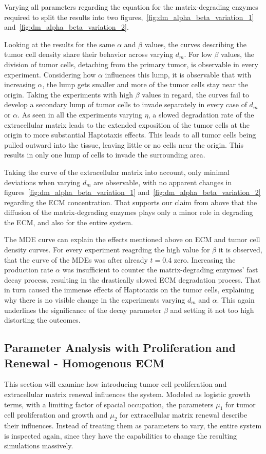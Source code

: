 Varying all parameters regarding the equation for the matrix-degrading enzymes required to split the results into two figures,~\ref{fig:dm_alpha_beta_variation_1} and~\ref{fig:dm_alpha_beta_variation_2}.

Looking at the results for the same $\alpha$ and $\beta$ values, the curves describing the tumor cell density share their behavior across varying $d_m$. For low $\beta$ values, the division of tumor cells, detaching from the primary tumor, is observable in every experiment. Considering how $\alpha$ influences this lump, it is observable that with increasing $\alpha$, the lump gets smaller and more of the tumor cells stay near the origin. Taking the experiments with high $\beta$ values in regard, the curves fail to develop a secondary lump of tumor cells to invade separately in every case of $d_m$ or $\alpha$. As seen in all the experiments varying $\eta$, a slowed degradation rate of the extracellular matrix leads to the extended exposition of the tumor cells at the origin to more substantial Haptotaxis effects. This leads to all tumor cells being pulled outward into the tissue, leaving little or no cells near the origin. This results in only one lump of cells to invade the surrounding area.

Taking the curve of the extracellular matrix into account, only minimal deviations when varying $d_m$ are observable, with no apparent changes in figures~\ref{fig:dm_alpha_beta_variation_1} and~\ref{fig:dm_alpha_beta_variation_2} regarding the ECM concentration. That supports our claim from above that the diffusion of the matrix-degrading enzymes plays only a minor role in degrading the ECM, and also for the entire system.

The MDE curve can explain the effects mentioned above on ECM and tumor cell density curves. For every experiment reagrding the high value for $\beta$ it is observed, that the curve of the MDEs was after already $t=0.4$ zero. Increasing the production rate $\alpha$ was insufficient to counter the matrix-degrading enzymes' fast decay process, resulting in the drastically slowed ECM degradation process. That in turn caused the immense effects of Haptotaxis on the tumor cells, explaining why there is no visible change in the experiments varying $d_m$ and $\alpha$. This again underlines the significance of the decay parameter $\beta$ and setting it not too high distorting the outcomes. 


\subsection{Parameter Analysis with Proliferation and Renewal - Homogenous ECM}
This section will examine how introducing tumor cell proliferation and extracellular matrix renewal influences the system. Modeled as logistic growth terms, with a limiting factor of spacial occupation, the parameters $\mu_1$ for tumor cell proliferation and growth and $\mu_2$ for extracellular matrix renewal describe their influences. Instead of treating them as parameters to vary, the entire system is inspected again, since they have the capabilities to change the resulting simulations massively.

